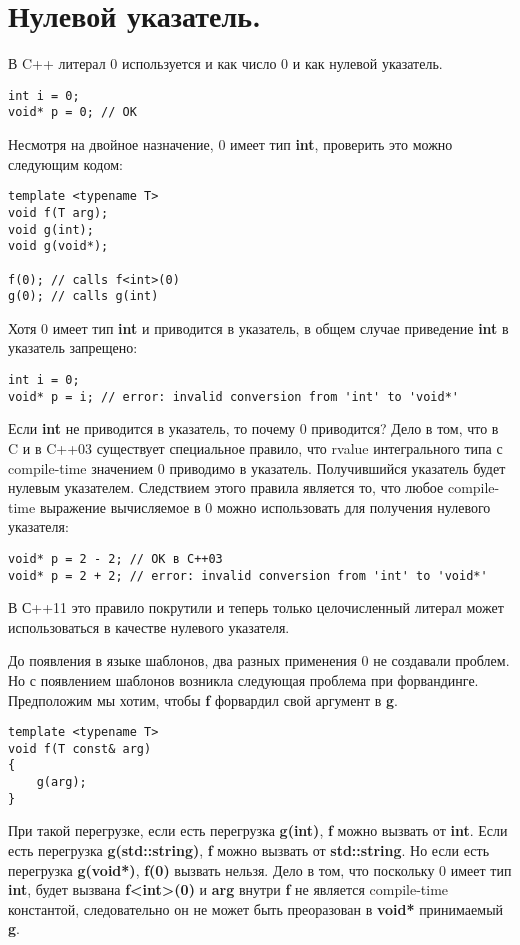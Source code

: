 \section{Нулевой указатель.}
В C++ литерал 0 используется и как число 0 и как нулевой указатель. 
\begin{verbatim}
int i = 0;
void* p = 0; // OK
\end{verbatim}
Несмотря на двойное назначение, 0 имеет тип {\bf int}, проверить это можно следующим кодом:
\begin{verbatim}
template <typename T>
void f(T arg);
void g(int);
void g(void*);

f(0); // calls f<int>(0)
g(0); // calls g(int)
\end{verbatim}
Хотя 0 имеет тип {\bf int} и приводится в указатель, в общем случае приведение {\bf int} в указатель запрещено:
\begin{verbatim}
int i = 0;
void* p = i; // error: invalid conversion from 'int' to 'void*'
\end{verbatim}
Если {\bf int} не приводится в указатель, то почему 0 приводится? Дело в том, что в C и в C++03 существует специальное правило, что rvalue интегрального типа с compile-time значением 0 приводимо в указатель. Получившийся указатель будет нулевым указателем. Следствием этого правила является то, что любое compile-time выражение вычисляемое в 0 можно использовать для получения нулевого указателя:
\begin{verbatim}
void* p = 2 - 2; // OK в C++03
void* p = 2 + 2; // error: invalid conversion from 'int' to 'void*'
\end{verbatim}
В С++11 это правило покрутили и теперь только целочисленный литерал может использоваться в качестве нулевого указателя.

До появления в языке шаблонов, два разных применения 0 не создавали проблем. Но с появлением шаблонов возникла следующая проблема при форвандинге. Предположим мы хотим, чтобы {\bf f} форвардил свой аргумент в {\bf g}.
\begin{verbatim}
template <typename T>
void f(T const& arg)
{
    g(arg);
}
\end{verbatim}
При такой перегрузке, если есть перегрузка {\bf g(int)}, {\bf f} можно вызвать от {\bf int}. Если есть перегрузка {\bf g(std::string)}, {\bf f} можно вызвать от {\bf std::string}. Но если есть перегрузка {\bf g(void*)}, {\bf f(0)} вызвать нельзя. Дело в том, что поскольку 0 имеет тип {\bf int}, будет вызвана {\bf f<int>(0)} и {\bf arg} внутри {\bf f} не является compile-time константой, следовательно он не может быть преоразован в {\bf void*} принимаемый {\bf g}.

